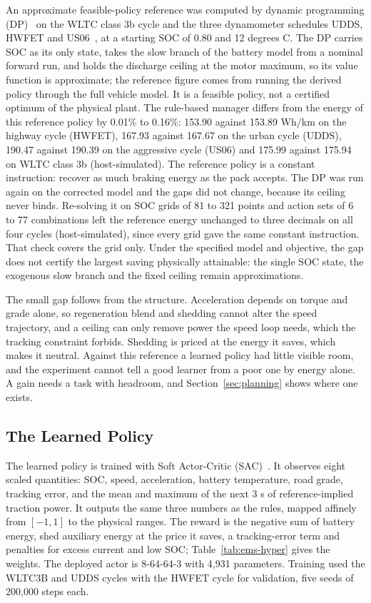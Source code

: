 \documentclass{ieeeaccess}
\begin{document}
An approximate feasible-policy reference was computed by dynamic programming (DP)~\cite{bellman1957} on the WLTC class 3b cycle and the three dynamometer schedules UDDS, HWFET and US06~\cite{epacycles}, at a starting SOC of 0.80 and 12 degrees C. The DP carries SOC as its only state, takes the slow branch of the battery model from a nominal forward run, and holds the discharge ceiling at the motor maximum, so its value function is approximate; the reference figure comes from running the derived policy through the full vehicle model. It is a feasible policy, not a certified optimum of the physical plant. The rule-based manager differs from the energy of this reference policy by 0.01\% to 0.16\%: 153.90 against 153.89 Wh/km on the highway cycle (HWFET), 167.93 against 167.67 on the urban cycle (UDDS), 190.47 against 190.39 on the aggressive cycle (US06) and 175.99 against 175.94 on WLTC class 3b (host-simulated). The reference policy is a constant instruction: recover as much braking energy as the pack accepts. The DP was run again on the corrected model and the gaps did not change, because its ceiling never binds. Re-solving it on SOC grids of 81 to 321 points and action sets of 6 to 77 combinations left the reference energy unchanged to three decimals on all four cycles (host-simulated), since every grid gave the same constant instruction. That check covers the grid only. Under the specified model and objective, the gap does not certify the largest saving physically attainable: the single SOC state, the exogenous slow branch and the fixed ceiling remain approximations.

The small gap follows from the structure. Acceleration depends on torque and grade alone, so regeneration blend and shedding cannot alter the speed trajectory, and a ceiling can only remove power the speed loop needs, which the tracking constraint forbids. Shedding is priced at the energy it saves, which makes it neutral. Against this reference a learned policy had little visible room, and the experiment cannot tell a good learner from a poor one by energy alone. A gain needs a task with headroom, and Section~\ref{sec:planning} shows where one exists.

\subsection{The Learned Policy}

The learned policy is trained with Soft Actor-Critic (SAC)~\cite{haarnoja2018}. It observes eight scaled quantities: SOC, speed, acceleration, battery temperature, road grade, tracking error, and the mean and maximum of the next 3 s of reference-implied traction power. It outputs the same three numbers as the rules, mapped affinely from $[-1, 1]$ to the physical ranges. The reward is the negative sum of battery energy, shed auxiliary energy at the price it saves, a tracking-error term and penalties for excess current and low SOC; Table~\ref{tab:ems-hyper} gives the weights. The deployed actor is 8-64-64-3 with 4,931 parameters. Training used the WLTC3B and UDDS cycles with the HWFET cycle for validation, five seeds of 200,000 steps each.
\end{document}
